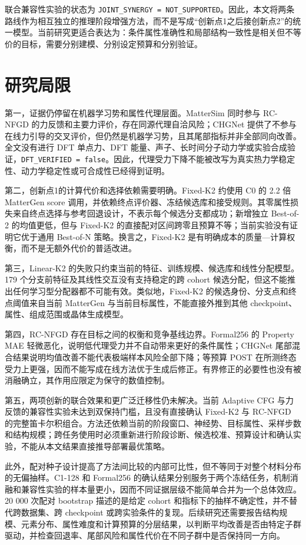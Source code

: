 联合兼容性实验的状态为 \texttt{JOINT\_SYNERGY\ =\ NOT\_SUP\allowbreak PORTED}。因此，本文将两条路线作为相互独立的推理阶段增强方法，而不是写成``创新点1之后接创新点2''的统一模型。当前研究更适合表达为：条件属性准确性和局部结构一致性是相关但不等价的目标，需要分别建模、分别设定预算和分别验证。

\section{研究局限}

第一，证据仍停留在机器学习势和属性代理层面。Matter\allowbreak Sim 同时参与 RC-NFGD 的力反馈和主要力评价，存在同源代理自洽风险；CHGNet 提供了不参与在线力引导的交叉评价，但仍然是机器学习势，且其尾部指标并非全部同向改善。全文没有进行 DFT 单点力、DFT 能量、声子、长时间分子动力学或实验合成验证，\texttt{DFT\_VERIFIED\ =\ false}。因此，代理受力下降不能被改写为真实热力学稳定性、动力学稳定性或可合成性已经得到证明。

第二，创新点1的计算代价和选择依赖需要明确。Fixed-K2 约使用 C0 的 2.2 倍 MatterGen score 调用，并依赖终点评价器、冻结候选库和接受规则。其零属性损失来自终点选择与参考回退设计，不表示每个候选分支都成功；新增独立 Best-of-2 的均值更低，但与 Fixed-K2 的直接配对区间跨零且预算不等；当前实验没有证明它优于通用 Best-of-N 策略。换言之，Fixed-K2 是有明确成本的质量---计算权衡，而不是无额外代价的普适改进。

第三，Linear-K2 的失败只约束当前的特征、训练规模、候选库和线性分配模型。179 个分支前特征及其线性交互没有支持稳定的跨 cohort 候选分配，但这不能推出任何学习型分配器都不可能有效。类似地，Fixed-K2 的候选身份、分支点和终点阈值来自当前 MatterGen 与当前目标属性，不能直接外推到其他 checkpoint、属性、组成范围或晶体生成模型。

第四，RC-NFGD 存在目标之间的权衡和竞争基线边界。Formal256 的 Property MAE 轻微恶化，说明低代理受力并不自动带来更好的条件属性；CHGNet 尾部混合结果说明均值改善不能代表极端样本风险全部下降；等预算 POST 在所测终态受力上更强，因而不能写成在线方法优于生成后修正。有界修正的必要性也没有被消融确立，其作用应限定为保守的数值控制。

第五，两项创新的联合效果和更广泛迁移性仍未解决。当前 Adaptive CFG 与力反馈的兼容性实验未达到双保持门槛，且没有直接确认 Fixed-K2 与 RC-NFGD 的完整笛卡尔积组合。方法还依赖当前的阶段窗口、神经势、目标属性、采样步数和结构规模；跨任务使用时必须重新进行阶段诊断、候选校准、预算设计和确认实验，不能从本文结果直接推导部署最优策略。

此外，配对种子设计提高了方法间比较的内部可比性，但不等同于对整个材料分布的无偏抽样。C1-128 和 Formal256 的确认结果分别服务于两个冻结任务，机制消融和兼容性实验的样本量更小，因而不同证据层级不能简单合并为一个总体效应。20 000 次配对 bootstrap 描述的是给定 cohort 和指标下的抽样不确定性，并不替代跨数据集、跨 checkpoint 或跨实验条件的复现。后续研究还需要报告结构规模、元素分布、属性难度和计算预算的分层结果，以判断平均改善是否由特定子群驱动，并检查回退率、尾部风险和属性代价在不同子群中是否保持同一方向。

